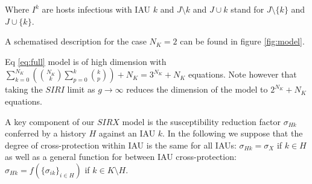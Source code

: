 Where $I^k$ are hosts infectious with IAU $k$ and $J\setminus k$ and
$J\cup k$ stand for $J\setminus \{k\}$ and $J\cup \{k\}$.

A schematised description for the case $N_K=2$ can be found in figure
\ref{fig:model}.

Eq \ref{eq:full} model is of high dimension with $\sum_{k=0}^{N_K} \left
  (\binom{N_K}{k} \sum_{p=0}^k \binom {k}{p} \right) +N_K =3^{N_K} +N_K$
equations. Note however that taking the $SIRI$ limit as $g\to \infty$
reduces the dimension of the model to $2^{N_K} +N_K$ equations.

A key component of our $SIRX$ model is the susceptibility reduction
factor $\sigma_{Hk}$ conferred by a history $H$ against an IAU $k$. In
the following we suppose that the degree of cross-protection within
IAU is the same for all IAUs: $\sigma_{Hk}=\sigma_{X}$ if $k\in H$ as
well as a general function for between IAU cross-protection:
$\sigma_{Hk}=f(\{\sigma_{ik}\}_{i\in H})$ if $k\in K\setminus H$.

